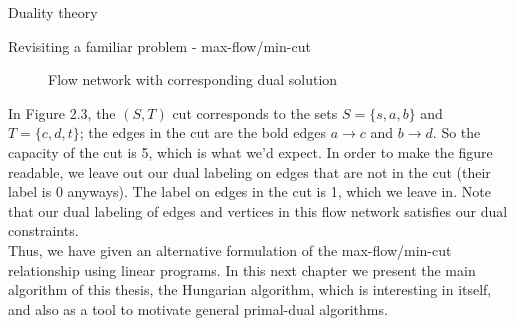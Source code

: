 \begin{section}{Duality theory}
\begin{subsection}{Revisiting a familiar problem - max-flow/min-cut}
\begin{figure}[H]
		\caption{Flow network with corresponding dual solution}
	\end{figure}
	In Figure 2.3, the $(S,T)$ cut corresponds to the sets $S= \{s,a,b\}$ and $T = \{c,d,t\}$; the 
	edges in the cut are the bold edges $a\to c$ and $b\to d$. So the capacity of the cut is 5, 
	which is what we'd expect. In order to make the figure readable, we leave out our dual labeling 
	on edges that are not in the cut (their label is 0 anyways). The label on edges in the cut is 
	1, which we leave in. Note that our dual labeling of edges and vertices in this flow network 
	satisfies our dual constraints.\\
	Thus, we have given an alternative formulation of the max-flow/min-cut relationship using 
	linear programs. In this next chapter we present the main algorithm of this thesis, the 
	Hungarian algorithm, which is interesting in itself, and also as a tool to motivate general 
	primal-dual algorithms.
\end{subsection}
\end{section}
